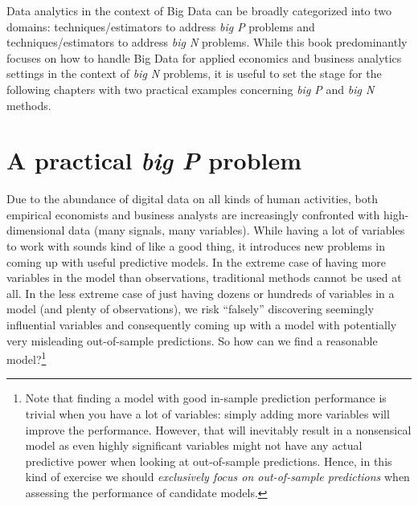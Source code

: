 \documentclass[
  12pt,
]{style/krantz}
\begin{document}
Data analytics in the context of Big Data can be broadly categorized into two domains: techniques/estimators to address \emph{big P} problems and techniques/estimators to address \emph{big N} problems. While this book predominantly focuses on how to handle Big Data for applied economics and business analytics settings in the context of \emph{big N} problems, it is useful to set the stage for the following chapters with two practical examples concerning \emph{big P} and \emph{big N} methods.

\hypertarget{a-practical-big-p-problem}{%
\section{\texorpdfstring{A practical \emph{big P} problem}{A practical big P problem}}\label{a-practical-big-p-problem}}

Due to the abundance of digital data on all kinds of human activities, both empirical economists and business analysts are increasingly confronted with high-dimensional data (many signals, many variables). While having a lot of variables to work with sounds kind of like a good thing, it introduces new problems in coming up with useful predictive models. In the extreme case of having more variables in the model than observations, traditional methods cannot be used at all. In the less extreme case of just having dozens or hundreds of variables in a model (and plenty of observations), we risk ``falsely'' discovering seemingly influential variables and consequently coming up with a model with potentially very misleading out-of-sample predictions. So how can we find a reasonable model?\footnote{Note that finding a model with good in-sample prediction performance is trivial when you have a lot of variables: simply adding more variables will improve the performance. However, that will inevitably result in a nonsensical model as even highly significant variables might not have any actual predictive power when looking at out-of-sample predictions. Hence, in this kind of exercise we should \emph{exclusively focus on out-of-sample predictions} when assessing the performance of candidate models.}
\end{document}
